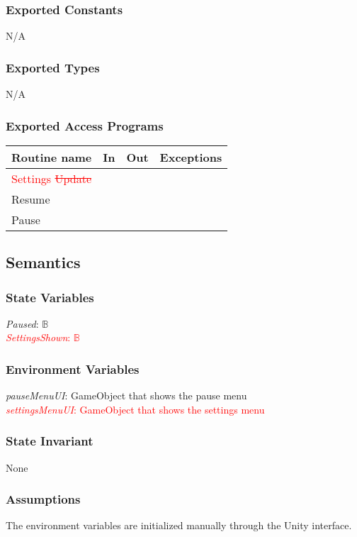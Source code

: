 \documentclass[12pt]{article}
\begin{document}
\subsubsection {Exported Constants}
N/A
\subsubsection {Exported Types}
N/A

\subsubsection {Exported Access Programs}

\begin{tabular}{| l | l | l | l |}
\hline
\textbf{Routine name} & \textbf{In} & \textbf{Out} & \textbf{Exceptions}\\
\hline
\textcolor{red}{Settings \sout{Update}} & & & \\
\hline
Resume & & & \\
\hline
Pause & & & \\
\hline 
\end{tabular}

\subsection {Semantics}

\subsubsection {State Variables}
\textit{Paused}: $\mathbb{B}$ \\
\textcolor{red}{\textit{SettingsShown}: $\mathbb{B}$} \\

\subsubsection {Environment Variables}
\textit{pauseMenuUI}: GameObject that shows the pause menu\\
\textcolor{red}{\textit{settingsMenuUI}: GameObject that shows the settings menu}

\subsubsection {State Invariant}
None

\subsubsection {Assumptions}
The environment variables are initialized manually through the Unity interface.
\end{document}
